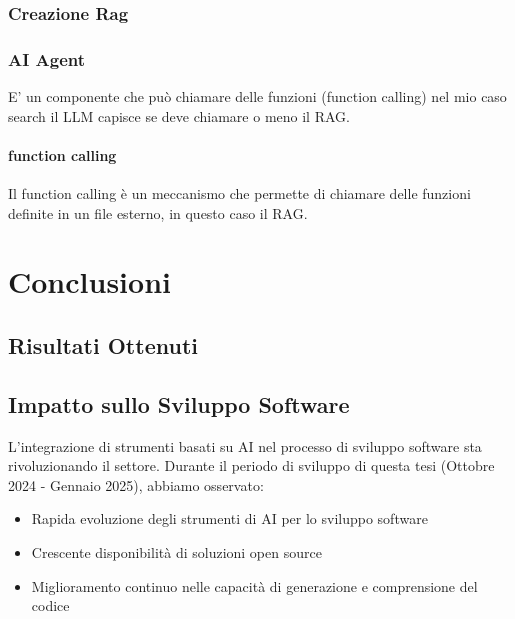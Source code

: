 \documentclass[12pt,a4paper,openright,twoside]{book}
\begin{document}
\subsection{Creazione Rag}

\subsection{AI Agent}
E' un componente che può chiamare delle funzioni (function calling) nel mio caso search
il LLM capisce se deve chiamare o meno il RAG.
\subsubsection{function calling}
Il function calling è un meccanismo che permette di chiamare delle funzioni definite in un file esterno, in questo caso il RAG.


\chapter{Conclusioni}

\section{Risultati Ottenuti}

\section{Impatto sullo Sviluppo Software}
L'integrazione di strumenti basati su AI nel processo di sviluppo software sta rivoluzionando il settore. Durante il periodo di sviluppo di questa tesi (Ottobre 2024 - Gennaio 2025), abbiamo osservato:
\begin{itemize}
    \item Rapida evoluzione degli strumenti di AI per lo sviluppo software
    \item Crescente disponibilità di soluzioni open source
    \item Miglioramento continuo nelle capacità di generazione e comprensione del codice
\end{itemize}
\end{document}
